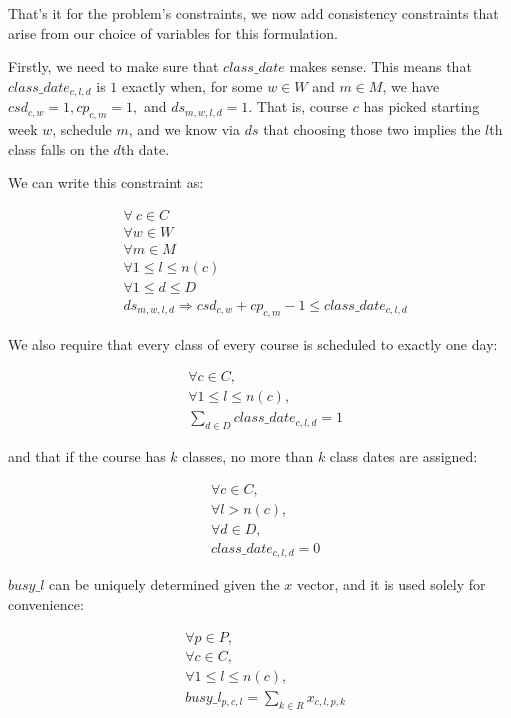 That's it for the problem's constraints, we now add consistency constraints that arise from our choice of variables for this formulation.

Firstly, we need to make sure that $class\_date$ makes sense. This means that $class\_date_{c, l, d}$ is $1$ exactly when, for some $w \in W$ and $m \in M$, we have $csd_{c, w} = 1, cp_{c, m} = 1,$ and $ds_{m, w, l, d} = 1$. That is, course $c$ has picked starting week $w$, schedule $m$, and we know via $ds$ that choosing those two implies the $l$th class falls on the $d$th date.

We can write this constraint as:

\begin{align}
  &\forall\ c \in C\\
  &\forall w \in W\\
  &\forall m \in M\\
  &\forall 1 \le l \le n(c)\\
  &\forall 1 \le d \le D\\
  &ds_{m, w, l, d} \Rightarrow csd_{c, w} + cp_{c, m} - 1 \le class\_date_{c, l, d}
\end{align}

We also require that every class of every course is scheduled to exactly one day:

\begin{align} \label{eq:oneclassdate}
  &\forall c \in C,\\
  &\forall 1 \le l \le n(c),\\
  &\sum_{d \in D} class\_date_{c, l, d} = 1
\end{align}

and that if the course has $k$ classes, no more than $k$ class dates are assigned:

\begin{align} \label{eq:maxclassdates}
  &\forall c \in C,\\
  &\forall l > n(c),\\
  &\forall d \in D,\\
  &class\_date_{c, l, d} = 0
\end{align}

$busy\_l$ can be uniquely determined given the $x$ vector, and it is used solely for convenience:

\begin{align}
  &\forall p \in P,\\
  &\forall c \in C,\\
  &\forall 1\le l \le n(c),\\
  &busy\_l_{p, c, l} = \sum_{k \in R} x_{c, l, p, k}
\end{align}

